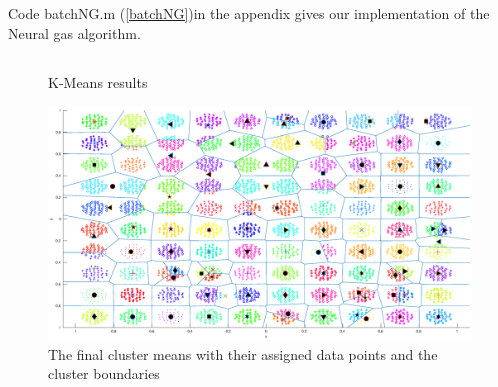 \documentclass[10pt]{article}
\begin{document}
\subsection{}
Code batchNG.m (\ref{batchNG})in the appendix gives our implementation of the Neural gas algorithm.

\subsection{}
\begin{figure}[H]
  \centering
  \caption{K-Means results}
    \includegraphics[width=\columnwidth]{Fig2_KMeans.eps}
    \caption{The final cluster means with their assigned data points and the cluster boundaries}
  \label{fig2kmeans}
\end{figure}
\end{document}
